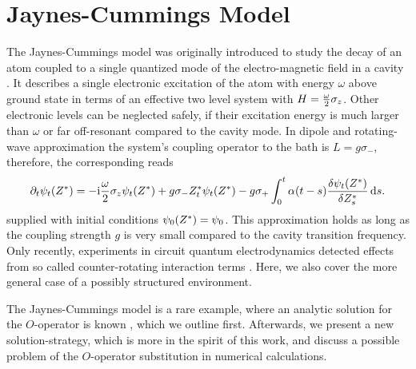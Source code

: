 \section{Jaynes-Cummings Model}
\label{sec:nmqsd.two_level}

%
The Jaynes-Cummings model was originally introduced to study the decay of an atom coupled to a single quantized mode of the electro-magnetic field in a cavity \cite{JaCu63_radiation_theory}.
It describes a single electronic excitation of the atom with energy $\omega$ above ground state in terms of an effective two level system with $H = \frac{\omega}{2}\sigma_z$.
Other electronic levels can be neglected safely, if their excitation energy is much larger than $\omega$ or far off-resonant compared to the cavity mode.
In dipole and rotating-wave approximation the system's coupling operator to the bath is $L = g\sigma_-$, therefore, the corresponding \NMSSE reads
\begin{equation}
  \partial_t \psitZ = -\ii\frac{\omega}{2}\sigma_z\psitZ + g \sigma_- \ZZ_t \psitZ - g\sigma_+ \int_0^t \alpha(t - s) \frac{\delta\psitZ}{\delta \ZZ_s} \dd s.
  \label{eq:nmqsd.nmsse_twolevel}
\end{equation}
supplied with initial conditions $\psi_0({Z}^*) = \psi_0$.
This approximation holds as long as the coupling strength $g$ is very small compared to the cavity transition frequency.
Only recently, experiments in circuit quantum electrodynamics detected effects from so called counter-rotating interaction terms \cite{NiDeHu10_circuit_qed}.
Here, we also cover the more general case of a possibly structured environment.

The Jaynes-Cummings model is a rare example, where an analytic solution for the $O$-operator is known \cite{DiGiSt98_nmqsd}, which we outline first.
Afterwards, we present a new solution-strategy, which is more in the spirit of this work, and discuss a possible problem of the $O$-operator substitution in numerical calculations.


